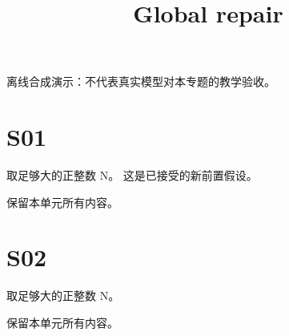 \documentclass[UTF8,fontset=fandol,11pt]{ctexart}
\title{Global repair}
\date{}
\begin{document}
\maketitle
\par\noindent 离线合成演示：不代表真实模型对本专题的教学验收。\par
\section{S01}\label{sec:S01}
取足够大的正整数 N。 这是已接受的新前置假设。\par
保留本单元所有内容。\par
\section{S02}\label{sec:S02}
取足够大的正整数 N。\par
保留本单元所有内容。\par
\end{document}
